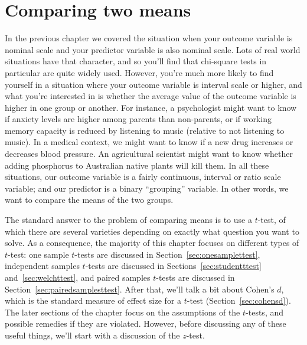 

\chapter{Comparing two means \label{ch:ttest}}

In the previous chapter we covered the situation when your outcome variable is nominal scale and your predictor variable is also nominal scale. Lots of real world situations have that character, and so you'll find that chi-square tests in particular are quite widely used. However, you're much more likely to find yourself in a situation where your outcome variable is interval scale or higher, and what you're interested in is whether the average value of the outcome variable is higher in one group or another. For instance, a psychologist might want to know if anxiety levels are higher among parents than non-parents, or if working memory capacity is reduced by listening to music (relative to not listening to music). In a medical context, we might want to know if a new drug increases or decreases blood pressure. An agricultural scientist might want to know whether adding phosphorus to Australian native plants will kill them. In all these situations, our outcome variable is a fairly continuous, interval or ratio scale variable; and our predictor is a binary ``grouping'' variable. In other words, we want to compare the means of the two groups. 

The standard answer to the problem of comparing means is to use a $t$-test, of which there are several varieties depending on exactly what question you want to solve. As a consequence, the majority of this chapter focuses on different types of $t$-test: one sample $t$-tests are discussed in Section~\ref{sec:onesamplettest}, independent samples $t$-tests are discussed in Sections~\ref{sec:studentttest} and~\ref{sec:welchttest}, and paired samples $t$-tests are discussed in Section~\ref{sec:pairedsamplesttest}. After that, we'll talk a bit about Cohen's $d$, which is the standard measure of effect size for a $t$-test (Section~\ref{sec:cohensd}). The later sections of the chapter focus on the assumptions of the $t$-tests, and possible remedies if they are violated. However, before discussing any of these useful things, we'll start with a discussion of the $z$-test. 


